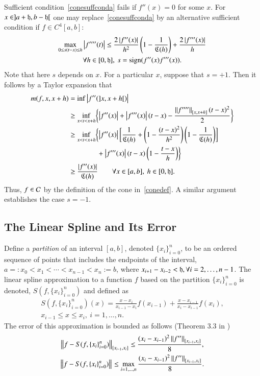 \documentclass[review]{elsarticle}
\newcommand{\datasites}{\{x_i\}_{i=0}^n}
\theoremstyle{definition}
\begin{document}
Sufficient condition~\eqref{conesuffconda} fails if $f''(x) = 0$ for some $x$.  For $x \in ]a + \fh, b-\fh[$ one may replace~\eqref{conesuffconda} by an alternative sufficient condition if  $f \in C^4[a,b]$:
\begin{multline} \label{conesuffcondb}
\max_{0 \le s(t-x) \le h }{\abs{f''''(t)}} \le \frac{2\abs{f''(x)}}{h^2} \left( 1 - \frac{1}{\fC(h)} \right) +  \frac{2\abs{f'''(x)}}{h}  \\ \forall  h \in [0,\fh], \ s = \sign(f''(x)f'''(x)).
\end{multline}
Note that here $s$ depends on $x$.  For a particular $x$, suppose that $s = +1$.  Then it follows by a Taylor expansion that
\begin{align*}
m(f,x,x+h) & = \inf \abs{f''(]x,x+h[)} \\
& \ge \inf_{x < t < x+h} \biggl\{ \abs{f''(x)} + \abs{f'''(x)}(t-x)  - \frac{\norm[{[x,x+h]}]{f''''}(t-x)^2}{2} \biggr\}\\
& \ge \inf_{x < t < x+h} \biggl\{ \abs{f''(x)} \biggl[ \frac{1}{\fC(h)} + \left(1 - \frac{(t-x)^2}{h^2}\right)\left(1 - \frac{1}{\fC(h)}\right) \biggr] \\
& \qquad \qquad + \abs{f'''(x)}(t-x)\left(1 -  \frac{t-x}{h}\right)  \biggr\}\\
& \ge  \frac{\abs{f''(x)}}{\fC(h)} \qquad \forall x \in [a,b],\ h \in [0,\fh].
\end{align*}
Thus, $f \in \cc$ by the definition of the cone in~\eqref{conedef}.  A similar argument establishes the case $s = -1$.

\subsection{The Linear Spline and Its Error} \label{subsec:spline}

Define a \emph{partition} of an interval $[a, b]$, denoted $\datasites$, to be
an ordered sequence of points that includes the endpoints of the interval,
$a=:x_0 < x_1 < \cdots < x_{n-1} < x_{n}:=b$, where $x_{i+1}-x_{i-2} <\fh, \forall i=2,\ldots, n-1$.  The linear spline
approximation to a function $f$ based on the partition $\datasites$ is denoted,
$S(f,\datasites)$ and defined as
\begin{multline} \label{splinedef}
S(f,\datasites)(x) =  \frac{x-x_i}{x_{i-1} - x_i} f(x_{i-1}) + \frac{x-x_{i-1}}{x_{i} - x_{i-1}}f(x_i), \\ x_{i-1} \le x \le x_i, \ i=1, \ldots, n.
\end{multline}
The error of this approximation is bounded as follows (Theorem 3.3 in \cite{a})
\begin{subequations} \label{appxerrbda}
\begin{gather}
\label{appxerrbdapc}
\norm[{[x_{i-1},x_i]}]{f - S(f,\datasites)} \le \frac{(x_i - x_{i-1})^2\norm[{[x_{i-1},x_i]}]{f''}}{8}, \\
\norm{f - S(f,\datasites)} \le \max_{i=1, \ldots, n} \frac{(x_i - x_{i-1})^2\norm[{[x_{i-1},x_i]}]{f''}}{8}.
\end{gather}
\end{subequations}
\end{document}
